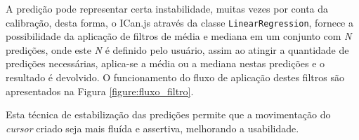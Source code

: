 \par A predição pode representar certa instabilidade, muitas vezes por conta da calibração, desta forma, o ICan.js através da classe \texttt{LinearRegression}, fornece a possibilidade da aplicação de filtros de média e mediana em um conjunto com \textit{N} predições, onde este \textit{N} é definido pelo usuário, assim ao atingir a quantidade de predições necessárias, aplica-se a média ou a mediana nestas predições e o resultado é devolvido. O funcionamento do fluxo de aplicação destes filtros são apresentados na Figura \ref{figure:fluxo_filtro}.


\par Esta técnica de estabilização das predições permite que a movimentação do \textit{cursor} criado seja mais fluída e assertiva, melhorando a usabilidade.
